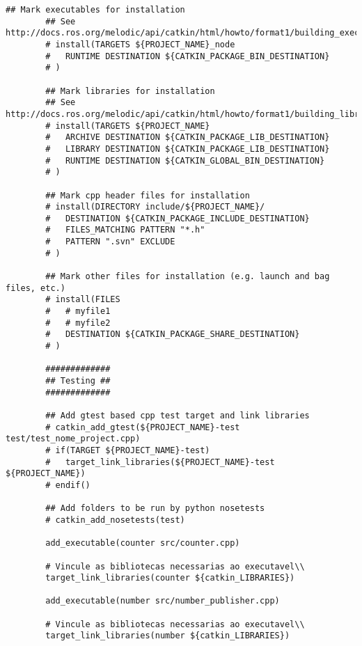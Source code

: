 \documentclass[letterpaper]{article}
\begin{document}
\begin{itemize}
\begin{lstlisting}[style=mystyle, title=src/nome\_project/CMakeLists.txt]
        ## Mark executables for installation
        ## See http://docs.ros.org/melodic/api/catkin/html/howto/format1/building_executables.html
        # install(TARGETS ${PROJECT_NAME}_node
        #   RUNTIME DESTINATION ${CATKIN_PACKAGE_BIN_DESTINATION}
        # )
        
        ## Mark libraries for installation
        ## See http://docs.ros.org/melodic/api/catkin/html/howto/format1/building_libraries.html
        # install(TARGETS ${PROJECT_NAME}
        #   ARCHIVE DESTINATION ${CATKIN_PACKAGE_LIB_DESTINATION}
        #   LIBRARY DESTINATION ${CATKIN_PACKAGE_LIB_DESTINATION}
        #   RUNTIME DESTINATION ${CATKIN_GLOBAL_BIN_DESTINATION}
        # )
        
        ## Mark cpp header files for installation
        # install(DIRECTORY include/${PROJECT_NAME}/
        #   DESTINATION ${CATKIN_PACKAGE_INCLUDE_DESTINATION}
        #   FILES_MATCHING PATTERN "*.h"
        #   PATTERN ".svn" EXCLUDE
        # )
        
        ## Mark other files for installation (e.g. launch and bag files, etc.)
        # install(FILES
        #   # myfile1
        #   # myfile2
        #   DESTINATION ${CATKIN_PACKAGE_SHARE_DESTINATION}
        # )
        
        #############
        ## Testing ##
        #############
        
        ## Add gtest based cpp test target and link libraries
        # catkin_add_gtest(${PROJECT_NAME}-test test/test_nome_project.cpp)
        # if(TARGET ${PROJECT_NAME}-test)
        #   target_link_libraries(${PROJECT_NAME}-test ${PROJECT_NAME})
        # endif()
        
        ## Add folders to be run by python nosetests
        # catkin_add_nosetests(test)
        
        add_executable(counter src/counter.cpp)
            
        # Vincule as bibliotecas necessarias ao executavel\\
        target_link_libraries(counter ${catkin_LIBRARIES})
        
        add_executable(number src/number_publisher.cpp)
            
        # Vincule as bibliotecas necessarias ao executavel\\
        target_link_libraries(number ${catkin_LIBRARIES})
        

\end{lstlisting}
\end{itemize}
\end{document}
